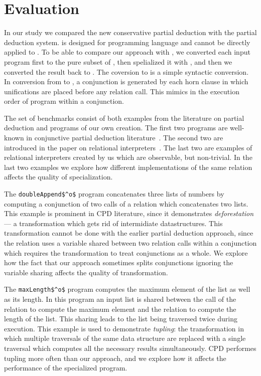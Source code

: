 \section{Evaluation}
In our study we compared the new conservative partial deduction with the \ecce partial deduction system.
\ecce is designed for \pro programming language and cannot be directly applied to \mk.
To be able to compare our approach with \ecce, we converted each input program first to the pure subset of \pro, then spelialized it with \ecce, and then we converted the result back to \mk.
The coversion to \pro is a simple syntactic conversion.
In conversion from \pro to \mk, a conjunction is generated by each horn clause in which unifications are placed before any relation call.
This mimics in \mk the execution order of \pro program within a conjunction.

The set of benchmarks consist of both examples from the literature on partial deduction and programs of our own creation.
The first two programs are well-known in conjunctive partial deduction literature~\cite{de1999conjunctive}.
The second two are introduced in the paper on relational interpreters~\cite{lozov2019relational}.
The last two are examples of relational interpreters created by us which are observable, but non-trivial.
In the last two examples we explore how different implementations of the same relation affects the quality of specialization.

The \lstinline{doubleAppend$^o$} program concatenates three lists of numbers by computing a conjunction of two calls of a relation which concatenates two lists.
This example is prominent in CPD literature, since it demonstrates \emph{deforestation} --- a transformation which gets rid of intermidiate datastructures.
This transformation cannot be done with the earlier partial deduction approach, since the relation uses a variable shared between two relation calls within a conjunction which requires the transformation to treat conjunctions as a whole.
We explore how the fact that our approach sometimes splits conjunctions ignoring the variable sharing affects the quality of transformation.

The \lstinline{maxLength$^o$} program computes the maximum element of the list as well as its length.
In this program an input list is shared between the call of the relation to compute the maximum element and the relation to compute the length of the list.
This sharing leads to the list being traversed twice during execution.
This example is used to demonstrate \emph{tupling}: the transformation in which multiple traversals of the same data structure are replaced with a single traversal which computes all the necessary results simultaneously.
CPD performes tupling more often than our approach, and we explore how it affects the performance of the specialized program.

